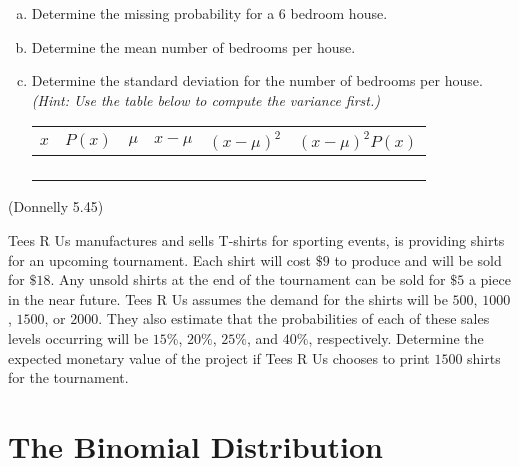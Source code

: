 \documentclass[12pt, letterpaper]{article}
\newcounter{exercise}
\theoremstyle{definition}
\begin{document}
\begin{enumerate}[(a)]

\item Determine the missing probability for a $6$ bedroom house.

\vfill

\item Determine the mean number of bedrooms per house.

\vfill
\newpage

\item Determine the standard deviation for the number of bedrooms per house.
\textit{(Hint:  Use the table below to compute the variance first.)}

\begin{center}
\begin{tabular}{|c|c|c|c|c|c|}\hline
$x$ & $P(x)$ & $\mu$ & $x-\mu$ & $(x-\mu)^2$ & $(x-\mu)^2P(x)$\\ \hline
 & & & & & \\ \hline
  & & & & & \\ \hline
   & & & & & \\ \hline
    & & & & & \\ \hline
\end{tabular}
\end{center}

\vfill

\end{enumerate}



\begin{exercise} (Donnelly 5.45)

Tees R Us manufactures and sells T-shirts for sporting events, is providing shirts for an upcoming tournament.  Each shirt will cost $\$9$ to produce and will be sold for $\$18$.  Any unsold shirts at the end of the tournament can be sold for $\$5$ a piece in the near future.  Tees R Us assumes the demand for the shirts will be $500$, $1000$, $1500$, or $2000$.  They also estimate that the probabilities of each of these sales levels occurring will be $15\%$, $20\%$, $25\%$, and $40\%$, respectively.  Determine the expected monetary value of the project if Tees R Us chooses to print $1500$ shirts for the tournament.

\end{exercise}

\vfill

\newpage

\section*{The Binomial Distribution}
\end{document}
